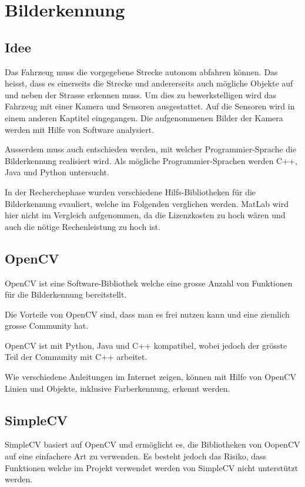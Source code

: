 \section{Bilderkennung}

\subsection{Idee}
Das Fahrzeug muss die vorgegebene Strecke autonom abfahren können. Das heisst, dass es einerseits die Strecke und andererseits auch mögliche Objekte auf und neben der Strasse erkennen muss. Um dies zu bewerkstelligen wird das Fahrzeug mit einer Kamera und Sensoren ausgestattet. Auf die Sensoren wird in einem anderen Kaptitel eingegangen. Die aufgenommenen Bilder der Kamera werden mit Hilfe von Software analysiert.

Ausserdem muss auch entschieden werden, mit welcher Programmier-Sprache die Bilderkennung realisiert wird. Als mögliche Programmier-Sprachen werden C++, Java und Python untersucht.

In der Recherchephase wurden verschiedene Hilfs-Bibliotheken für die Bilderkennung evauliert, welche im Folgenden verglichen werden.
MatLab wird hier nicht im Vergleich aufgenommen, da die Lizenzkosten zu hoch wären und auch die nötige Rechenleistung zu hoch ist.

\subsection{OpenCV}
OpenCV ist eine Software-Bibliothek welche eine grosse Anzahl von Funktionen für die Bilderkennung bereitstellt.

Die Vorteile von OpenCV sind, dass man es frei nutzen kann und eine ziemlich grosse Community hat.

OpenCV ist mit Python, Java und C++ kompatibel, wobei jedoch der grösste Teil der Community mit C++ arbeitet.

Wie verschiedene Anleitungen im Internet zeigen, können mit Hilfe von OpenCV Linien und Objekte, inklusive Farberkennung, erkennt werden.

\subsection{SimpleCV}
SimpleCV basiert auf OpenCV und ermöglicht es, die Bibliotheken von OopenCV auf eine einfachere Art zu verwenden. Es besteht jedoch das Risiko, dass Funktionen welche im Projekt verwendet werden von SimpleCV nicht unterstützt werden.



